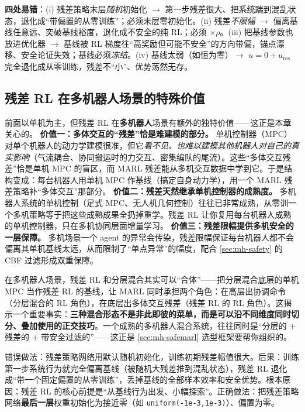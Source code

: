 \noindent\textbf{四处易错}：(i) 残差策略末层\emph{随机}初始化 $\to$ 第一步残差很大、把系统踹到混乱状态，退化成“带偏置的从零训练”；必须末层零初始化。(ii) 残差\emph{不限幅} $\to$ 偏离基线任意远、突破基线裕度，退化成不安全的纯 RL；必须 \verb@tanh@$\times\rho$。(iii) 把基线参数也放进优化器 $\to$ 基线被 RL 梯度往“高奖励但可能不安全”的方向带偏，锚点漂移、安全论证失效；基线必须\emph{冻结}。(iv) 基线太弱（如恒为零）$\to$ $u=0+u_{\text{res}}$ 完全退化成从零训练，残差不“小”、优势荡然无存。

\subsection{残差 RL 在多机器人场景的特殊价值}
\label{sec:mh-residual-multibot}

前面以单机为主，但残差 RL 在\textbf{多机器人}场景有额外的独特价值——这正是本章关心的。
\textbf{价值一：多体交互的“残差”恰是难建模的部分。} 单机控制器（MPC）对单个机器人的动力学建模很准，但它\emph{看不见、也难以建模其他机器人对自己的真实影响}（气流耦合、协同搬运时的力交互、密集编队的尾流）。这些“多体交互残差”恰是单机 MPC 的盲区，而 MARL 残差能从多机交互数据中学到它。于是结构变成：每台机器人用单机 MPC 作基线（搞定自身动力学），用一个 MARL 残差策略补“多体交互”那部分。
\textbf{价值二：残差天然继承单机控制器的成熟度。} 多机器人系统的单机控制（足式 MPC、无人机几何控制）往往已非常成熟，从零训一个多机策略等于把这些成熟成果全扔掉重学。残差 RL 让你复用每台机器人成熟的单机控制器，只在多机协同层面增量学习。
\textbf{价值三：残差限幅提供多机安全的一层保障。} 多机场景一个 agent 的异常会传染，残差限幅保证每台机器人都不会偏离其单机基线太远，从而限制了“单点异常”的幅度，配合 \cref{sec:mh-safety} 的 CBF 过滤形成双重保障。

\begin{insight}[三种混合形态可沿不同维度同时切分、叠加]
在多机器人场景，残差 RL 和分层混合其实可以“合体”——把分层混合底层的单机 MPC 当作残差 RL 的基线，让 MARL 同时承担两个角色：在高层出协调命令（分层混合的 RL 角色），在底层出多体交互残差（残差 RL 的 RL 角色）。这揭示一个重要事实：\textbf{三种混合形态不是非此即彼的菜单，而是可以沿不同维度同时切分、叠加使用的正交技巧}。一个成熟的多机器人混合系统，往往同时是“分层的 $+$ 残差的 $+$ 带安全过滤的”——这正是 \cref{sec:mh-safemarl} 选型框架要帮你组织的。
\end{insight}

\begin{pitfall}
错误做法：残差策略网络用默认随机初始化，训练初期残差幅值很大。后果：训练第一步系统行为就完全偏离基线（被随机大残差推到混乱状态），残差 RL 退化成“带一个固定偏置的从零训练”，丢掉基线的全部样本效率和安全优势。根本原因：残差 RL 的核心前提是“从基线行为出发、小幅探索”。正确做法：把残差策略网络\textbf{最后一层}权重初始化为接近零（如 \texttt{uniform(-1e-3,1e-3)}）、偏置为零。
\end{pitfall}

